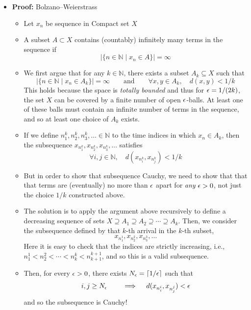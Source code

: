 \documentclass[11pt,twoside]{report}
\newcommand{\bbN}{{\mathbb{N}}}
\newcommand{\bbR}{{\mathbb{R}}}
\begin{document}
\begin{itemize}
\item \textbf{Proof:} Bolzano--Weierstrass%
\begin{itemize}
\item Let $x_n$ be sequence in Compact set $X$%

\item A subset $A \subset X$ contains (countably) infinitely many terms in the sequence if
\[
 | \{ n \in \bbN \mid x_n \in A \} | = \infty 
\]
\item We first argue that for any  $k  \in \bbN$, there exists a subset $A_k \subseteq X$ such that 
\[
 | \{ n \in \bbN \mid x_n \in A_k \} | = \infty  \qquad \text{and} \qquad  \forall x, y \in A_k, \quad  d(x,y)  < 1/k 
\]
This holds because the space is \emph{totally bounded} and thus for $\epsilon = 1/(2k)$, the set $X$ can be covered by a finite number of open $\epsilon$-balls. At least one of these balls must contain an infinite number of terms in the sequence, and so at least one choice of $A_k$ exists. 

\item If we define $n^k_1, n^k_2, n^k_3, \dots \in \bbN$  to the time indices in which $x_n \in A_k$, then the subsequence $x_{n^k_1}, x_{n^k_2}, x_{n^k_3}, \dots$ satisfies
\[
\forall i, j \in \bbN, \quad  d(x_{n_i^k},x_{n_j^k} )  < 1/k 
\]

\item But in order to show that subsequence Cauchy, we need to show that that that terms are (eventually) no more than $\epsilon$ apart for \emph{any} $\epsilon > 0$, not just the choice $1/k$ constructed above. 

\item The solution is to apply the argument above recursively to define a decreasing sequence of sets $X \supseteq A_1  \supseteq A_2 \supseteq \cdots \supseteq A_k$.  Then, we consider the subsequence defined by that $k$-th arrival in the $k$-th subset, 
\[
x_{n_1^1}, x_{n_2^2},  x_{n_3^3}, \dots
\]
Here it is easy to check that  the indices are strictly increasing, i.e., $n_1^1 <  n_2^2  < \cdots  < n_k^k  < n_{k+1}^{k+1}$, and so this is a valid subsequence. 

\item Then, for every $\epsilon > 0$, there exists $N_\epsilon = \lceil 1/\epsilon \rceil$ such that  %
\[
i, j \ge N_\epsilon  \qquad \implies \quad d(x_{n_i^i}, x_{n_j^j})  < \epsilon 
\]
 and so the subsequence is Cauchy!
 

\end{itemize}
\end{itemize}
\end{document}

